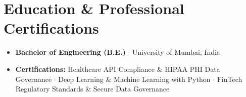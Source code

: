 \documentclass[10pt,letterpaper]{article}
\begin{document}
\section{Education \& Professional Certifications}
\vspace{2pt}
\begin{itemize}[leftmargin=*, nosep]
    \item \textbf{Bachelor of Engineering (B.E.)} $\cdot$ University of Mumbai, India
    \item \textbf{Certifications:} Healthcare API Compliance \& HIPAA PHI Data Governance $\cdot$ Deep Learning \& Machine Learning with Python $\cdot$ FinTech Regulatory Standards \& Secure Data Governance
\end{itemize}
\end{document}
